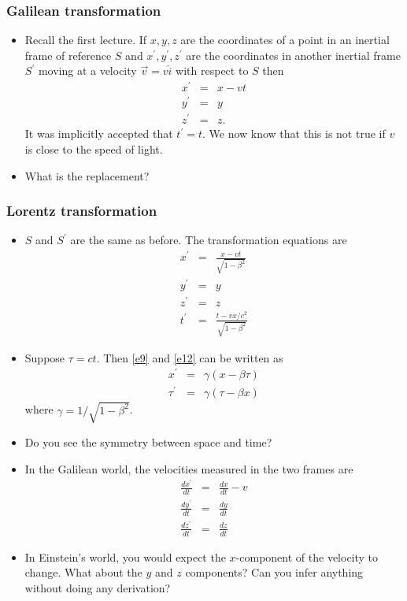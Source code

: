 \documentclass{beamer}
\begin{document}
\begin{frame}
\frametitle{Galilean transformation}
\begin{itemize}
\item 
Recall the first lecture. If $x, y, z$ are the coordinates of a point in an
inertial frame of reference $S$ and $x^\prime, y^\prime, z^\prime$ are the
coordinates in another inertial frame $S^\prime$ moving at a velocity $\vec{v}
= v\hat{i}$ with respect to $S$ then
\begin{eqnarray}
x^\prime &=& x - vt \label{e6} \\
y^\prime &=& y \label{e7} \\
z^\prime &=& z. \label{e8}
\end{eqnarray}
It was implicitly accepted that $t^\prime = t$. We now know that this is not
true if $v$ is close to the speed of light.
\item What is the replacement?
\end{itemize}
\end{frame}

\begin{frame}
\frametitle{Lorentz transformation}
\begin{itemize}
\item $S$ and $S^\prime$ are the same as before. The transformation equations 
are
\begin{eqnarray}
x^\prime &=& \frac{x - vt}{\sqrt{1 - \beta^2}} \label{e9} \\
y^\prime &=& y \label{e10} \\
z^\prime &=& z \label{e11} \\
t^\prime &=& \frac{t - vx/c^2}{\sqrt{1 - \beta^2}} \label{e12}
\end{eqnarray}
\item Suppose $\tau = ct$. Then \eqref{e9} and \eqref{e12} can be written as
\begin{eqnarray}
x^\prime &=& \gamma(x - \beta\tau) \label{e13} \\
\tau^\prime &=& \gamma(\tau - \beta x) \label{e14}
\end{eqnarray}
where $\gamma = 1/\sqrt{1 - \beta^2}$.
\item Do you see the symmetry between space and time?
\end{itemize}
\end{frame}

\begin{frame}
\begin{itemize}
\item In the Galilean world, the velocities measured in the two frames are
\begin{eqnarray}
\frac{dx^\prime}{dt} &=& \frac{dx}{dt} - v \label{e15} \\
\frac{dy^\prime}{dt} &=& \frac{dy}{dt} \label{e16} \\
\frac{dz^\prime}{dt} &=& \frac{dz}{dt} \label{e17}
\end{eqnarray}
\item In Einstein's world, you would expect the $x$-component of the velocity
to change. What about the $y$ and $z$ components? Can you infer anything without
doing any derivation?
\end{itemize}
\end{frame}
\end{document}
